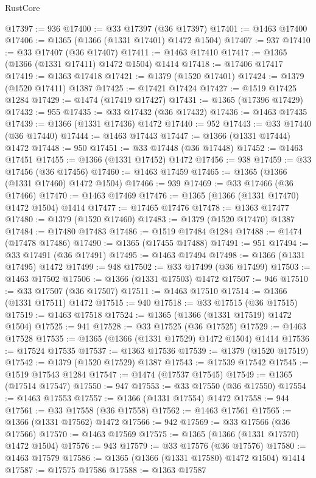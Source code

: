 \begin{lexlean}{RustCore}
\begin{coremodule}
@17397 := 936
@17400 := @33 @17397 (@36 @17397)
@17401 := @1463 @17400
@17406 := @1365 (@1366 (@1331 @17401) @1472 @1504)
@17407 := 937
@17410 := @33 @17407 (@36 @17407)
@17411 := @1463 @17410
@17417 := @1365 (@1366 (@1331 @17411) @1472 @1504) @1414
@17418 := @17406 @17417
@17419 := @1363 @17418
@17421 := @1379 (@1520 @17401)
@17424 := @1379 (@1520 @17411) @1387
@17425 := @17421 @17424
@17427 := @1519 @17425 @1284
@17429 := @1474 (@17419 @17427)
@17431 := @1365 (@17396 @17429)
@17432 := 955
@17435 := @33 @17432 (@36 @17432)
@17436 := @1463 @17435
@17439 := @1366 (@1331 @17436) @1472
@17440 := 952
@17443 := @33 @17440 (@36 @17440)
@17444 := @1463 @17443
@17447 := @1366 (@1331 @17444) @1472
@17448 := 950
@17451 := @33 @17448 (@36 @17448)
@17452 := @1463 @17451
@17455 := @1366 (@1331 @17452) @1472
@17456 := 938
@17459 := @33 @17456 (@36 @17456)
@17460 := @1463 @17459
@17465 := @1365 (@1366 (@1331 @17460) @1472 @1504)
@17466 := 939
@17469 := @33 @17466 (@36 @17466)
@17470 := @1463 @17469
@17476 := @1365 (@1366 (@1331 @17470) @1472 @1504) @1414
@17477 := @17465 @17476
@17478 := @1363 @17477
@17480 := @1379 (@1520 @17460)
@17483 := @1379 (@1520 @17470) @1387
@17484 := @17480 @17483
@17486 := @1519 @17484 @1284
@17488 := @1474 (@17478 @17486)
@17490 := @1365 (@17455 @17488)
@17491 := 951
@17494 := @33 @17491 (@36 @17491)
@17495 := @1463 @17494
@17498 := @1366 (@1331 @17495) @1472
@17499 := 948
@17502 := @33 @17499 (@36 @17499)
@17503 := @1463 @17502
@17506 := @1366 (@1331 @17503) @1472
@17507 := 946
@17510 := @33 @17507 (@36 @17507)
@17511 := @1463 @17510
@17514 := @1366 (@1331 @17511) @1472
@17515 := 940
@17518 := @33 @17515 (@36 @17515)
@17519 := @1463 @17518
@17524 := @1365 (@1366 (@1331 @17519) @1472 @1504)
@17525 := 941
@17528 := @33 @17525 (@36 @17525)
@17529 := @1463 @17528
@17535 := @1365 (@1366 (@1331 @17529) @1472 @1504) @1414
@17536 := @17524 @17535
@17537 := @1363 @17536
@17539 := @1379 (@1520 @17519)
@17542 := @1379 (@1520 @17529) @1387
@17543 := @17539 @17542
@17545 := @1519 @17543 @1284
@17547 := @1474 (@17537 @17545)
@17549 := @1365 (@17514 @17547)
@17550 := 947
@17553 := @33 @17550 (@36 @17550)
@17554 := @1463 @17553
@17557 := @1366 (@1331 @17554) @1472
@17558 := 944
@17561 := @33 @17558 (@36 @17558)
@17562 := @1463 @17561
@17565 := @1366 (@1331 @17562) @1472
@17566 := 942
@17569 := @33 @17566 (@36 @17566)
@17570 := @1463 @17569
@17575 := @1365 (@1366 (@1331 @17570) @1472 @1504)
@17576 := 943
@17579 := @33 @17576 (@36 @17576)
@17580 := @1463 @17579
@17586 := @1365 (@1366 (@1331 @17580) @1472 @1504) @1414
@17587 := @17575 @17586
@17588 := @1363 @17587

\end{coremodule}
\end{lexlean}
